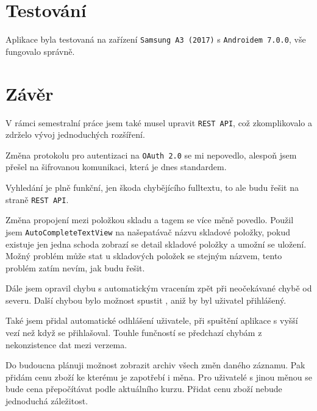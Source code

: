 \documentclass[12pt]{report}
\begin{document}
\chapter{Testování}
Aplikace byla testovaná na zařízení \texttt{Samsung A3 (2017)} s \texttt{Androidem 7.0.0}, vše fungovalo správně.

\chapter{Závěr}
V rámci semestralní práce jsem také musel upravit \texttt{REST API}, což zkomplikovalo a zdrželo vývoj jednoduchých rozšíření.

Změna protokolu pro autentizaci na \texttt{OAuth 2.0} se mi nepovedlo, alespoň jsem přešel na šifrovanou komunikaci, která je dnes standardem.

Vyhledání je plně funkční, jen škoda chybějícího fulltextu, to ale budu řešit na straně \texttt{REST API}.

Změna propojení mezi položkou skladu a tagem se více měně povedlo. Použil jsem \texttt{AutoCompleteTextView} na našepatávač názvu skladové položky, pokud existuje jen jedna schoda zobrazí se detail skladové položky a umožní se uložení. Možný problém může stat u skladových položek se stejným názvem, tento problém zatím nevím, jak budu řešit.

Dále jsem opravil chybu s automatickým vracením zpět při neočekávané chybě od severu.
Další chybou bylo možnost spustit , aniž by byl uživatel přihlášený.

Také jsem přidal automatické odhlášení uživatele, při spuštění aplikace s vyšší vezí než když se přihlašoval. Touhle funčností se předchazí chybám z nekonzistence dat mezi verzema. 

Do budoucna plánuji možnost zobrazit archiv všech změn daného záznamu. Pak přidám cenu zboží ke kterému je zapotřebí i měna. Pro uživatelé s jinou měnou se bude cena přepočítávat podle aktuálního kurzu. Přidat cenu zboží nebude jednoduchá záležitost.
\end{document}
